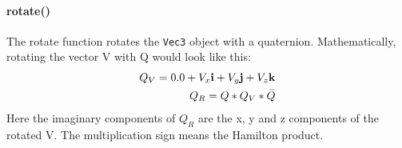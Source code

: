 \documentclass{article}
\begin{document}
\paragraph*{rotate()}
The rotate function rotates the \verb|Vec3| object with a quaternion. Mathematically, rotating the vector V with Q would look like this:
\begin{eqnarray}
	Q_V = 0.0 + V_x\mathbf{i} + V_y\mathbf{j} + V_z\mathbf{k}\\
	Q_R = Q*Q_V*\Bar{Q}\\
\end{eqnarray}
Here the imaginary components of $Q_R$ are the x, y and z components of the rotated V. The multiplication sign means the Hamilton product.
\end{document}
